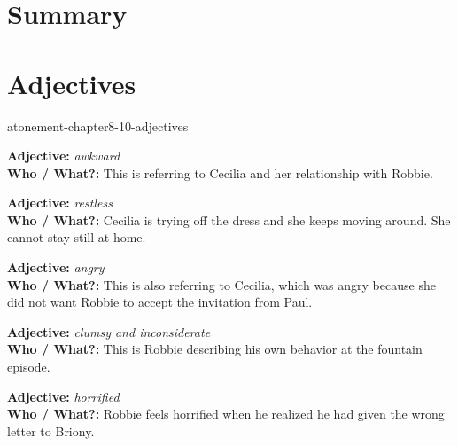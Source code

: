 \documentclass[preview]{standalone}
\begin{document}
\genpage

\section{Summary}

\section{Adjectives}

\begin{snippet}{atonement-chapter8-10-adjectives}
\begin{minipage}[l]{0.05\textwidth}
\end{minipage}
\begin{minipage}[r]{0.95\textwidth}
    \textbf{Adjective:} \textit{awkward}
    \\
    \textbf{Who / What?:} This is referring to Cecilia and her relationship with Robbie.
\end{minipage}
\hr
\begin{minipage}[l]{0.05\textwidth}
\end{minipage}
\begin{minipage}[r]{0.95\textwidth}
    \textbf{Adjective:} \textit{restless}
    \\
    \textbf{Who / What?:} Cecilia is trying off the dress and she keeps moving around.
    She cannot stay still at home.
\end{minipage}
\hr
\begin{minipage}[l]{0.05\textwidth}
\end{minipage}
\begin{minipage}[r]{0.95\textwidth}
    \textbf{Adjective:} \textit{angry}
    \\
    \textbf{Who / What?:} This is also referring to Cecilia, which was angry because
    she did not want Robbie to accept the invitation from Paul.
\end{minipage}
\hr
\begin{minipage}[l]{0.05\textwidth}
\end{minipage}
\begin{minipage}[r]{0.95\textwidth}
    \textbf{Adjective:} \textit{clumsy and inconsiderate}
    \\
    \textbf{Who / What?:} This is Robbie describing his own behavior
    at the fountain episode.
\end{minipage}
\hr
\begin{minipage}[l]{0.05\textwidth}
\end{minipage}
\begin{minipage}[r]{0.95\textwidth}
    \textbf{Adjective:} \textit{horrified}
    \\
    \textbf{Who / What?:} Robbie feels horrified when he realized he had given
    the wrong letter to Briony.
\end{minipage}
\end{snippet}
\end{document}
